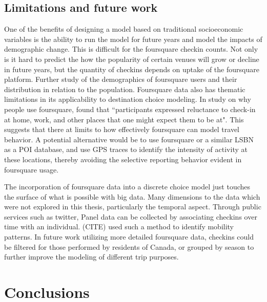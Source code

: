 \section{Limitations and future work}
One of the benefits of designing a model based on traditional socioeconomic variables is the ability to run the model for future years and model the impacts of demographic change. This is difficult for the foursquare checkin counts. Not only is it hard to predict the how the popularity of certain venues will grow or decline in future years, but the quantity of checkins depends on uptake of the foursquare platform. Further study of the demographics of foursquare users and their distribution in relation to the population. Foursquare data also has thematic limitations in its applicability to destination choice modeling. 
In study on why people use foursquare, \textcite{lindqvist2011m} found that ``participants expressed reluctance to check-in at home, work, and other places that one might expect them to be at". This suggests that there at limits to how effectively foursquare can model travel behavior. A potential alternative would be to use foursquare or a similar LSBN as a POI database, and use GPS traces to identify the intensity of activity at these locations, thereby avoiding the selective reporting behavior evident in foursquare usage.

The incorporation of foursquare data into a discrete choice model just touches the surface of what is possible with big data. 
Many dimensions to the data which were not explored in this thesis,  particularly the temporal aspect. Through public services such as twitter, Panel data can be collected by associating checkins over time with an individual. (CITE) used such a method to identify mobility patterns. In future work utilizing more detailed foursquare data, checkins could be filtered for those performed by residents of Canada, or grouped by season to further improve the modeling of different trip purposes.

\chapter{Conclusions}
